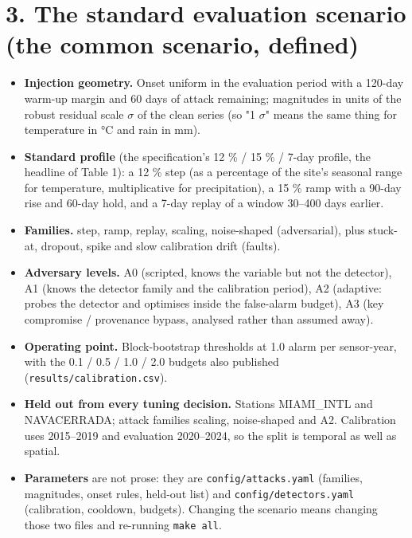 \documentclass[10pt,a4paper]{article}
\begin{document}
\section*{3. The standard evaluation scenario (the common scenario, defined)}
\begin{itemize}
\item \textbf{Injection geometry.} Onset uniform in the evaluation period with a 120-\allowbreak{}day
warm-\allowbreak{}up margin and 60 days of attack remaining; magnitudes in units of the robust residual scale $\sigma$ of the clean series (so "1 $\sigma$" means the same thing for temperature in °C and rain in mm).

\item \textbf{Standard profile} (the specification's 12 \% /\allowbreak{} 15 \% /\allowbreak{} 7-\allowbreak{}day profile, the
headline of Table 1): a 12 \% step (as a percentage of the site's seasonal range for temperature, multiplicative for precipitation), a 15 \% ramp with a 90-\allowbreak{}day rise and 60-\allowbreak{}day hold, and a 7-\allowbreak{}day replay of a window 30–400 days earlier.

\item \textbf{Families.} step, ramp, replay, scaling, noise-\allowbreak{}shaped (adversarial), plus
stuck-\allowbreak{}at, dropout, spike and slow calibration drift (faults).

\item \textbf{Adversary levels.} A0 (scripted, knows the variable but not the detector),
A1 (knows the detector family and the calibration period), A2 (adaptive: probes the detector and optimises inside the false-\allowbreak{}alarm budget), A3 (key compromise /\allowbreak{} provenance bypass, analysed rather than assumed away).

\item \textbf{Operating point.} Block-\allowbreak{}bootstrap thresholds at 1.0 alarm per sensor-\allowbreak{}year,
with the 0.1 /\allowbreak{} 0.5 /\allowbreak{} 1.0 /\allowbreak{} 2.0 budgets also published (\texttt{results/\allowbreak{}calibration.csv}).

\item \textbf{Held out from every tuning decision.} Stations MIAMI\_\allowbreak{}INTL and NAVACERRADA;
attack families scaling, noise-\allowbreak{}shaped and A2. Calibration uses 2015–2019 and evaluation 2020–2024, so the split is temporal as well as spatial.

\item \textbf{Parameters} are not prose: they are \texttt{config/\allowbreak{}attacks.yaml} (families,
magnitudes, onset rules, held-\allowbreak{}out list) and \texttt{config/\allowbreak{}detectors.yaml} (calibration, cooldown, budgets). Changing the scenario means changing those two files and re-\allowbreak{}running \texttt{make all}.

\end{itemize}
\end{document}
